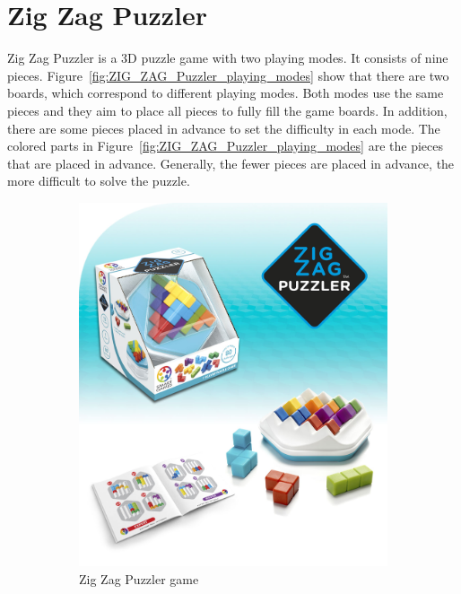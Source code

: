 \section{Zig Zag Puzzler}
Zig Zag Puzzler is a 3D puzzle game with two playing modes. It consists of nine pieces. Figure~\ref{fig:ZIG_ZAG_Puzzler_playing_modes} show that there are two boards, which correspond to different playing modes. Both modes use the same pieces and they aim to place all pieces to fully fill the game boards. In addition, there are some pieces placed in advance to set the difficulty in each mode. The colored parts in Figure~\ref{fig:ZIG_ZAG_Puzzler_playing_modes} are the pieces that are placed in advance. Generally, the fewer pieces are placed in advance, the more difficult to solve the puzzle.
\begin{figure}[htbp]
    \centering
    \begin{subfigure}[b]{0.32\textwidth}
    \includegraphics[width=\textwidth]{figs/zigzagdescription.jpg}
    \caption{Zig Zag Puzzler game}
    \end{subfigure}
    \begin{subfigure}[b]{0.32\textwidth}

\end{subfigure}
\end{figure}
